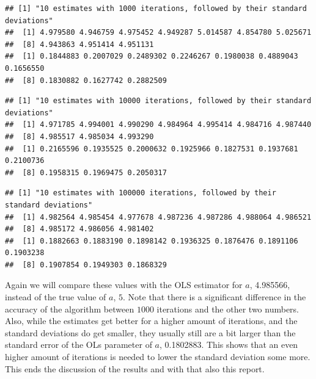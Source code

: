 \documentclass[a4paper,10pt]{article}\usepackage[]{graphicx}\usepackage[]{color}
\makeatletter
\newenvironment{kframe}{%
 \def\at@end@of@kframe{}%
 \ifinner\ifhmode%
  \def\at@end@of@kframe{\end{minipage}}%
  \begin{minipage}{\columnwidth}%
 \fi\fi%
 \def\FrameCommand##1{\hskip\@totalleftmargin \hskip-\fboxsep
 \colorbox{shadecolor}{##1}\hskip-\fboxsep
     \hskip-\linewidth \hskip-\@totalleftmargin \hskip\columnwidth}%
 \MakeFramed {\advance\hsize-\width
   \@totalleftmargin\z@ \linewidth\hsize
   \@setminipage}}%
 {\par\unskip\endMakeFramed%
 \at@end@of@kframe}
\newenvironment{knitrout}{}{} %
\makeatother
\begin{document}
\begin{knitrout}
\color{fgcolor}\begin{kframe}
\begin{verbatim}
## [1] "10 estimates with 1000 iterations, followed by their standard deviations"
##  [1] 4.979580 4.946759 4.975452 4.949287 5.014587 4.854780 5.025671
##  [8] 4.943863 4.951414 4.951131
##  [1] 0.1844883 0.2007029 0.2489302 0.2246267 0.1980038 0.4889043 0.1656550
##  [8] 0.1830882 0.1627742 0.2882509
\end{verbatim}
\end{kframe}
\end{knitrout}
\begin{knitrout}
\color{fgcolor}\begin{kframe}
\begin{verbatim}
## [1] "10 estimates with 10000 iterations, followed by their standard deviations"
##  [1] 4.971785 4.994001 4.990290 4.984964 4.995414 4.984716 4.987440
##  [8] 4.985517 4.985034 4.993290
##  [1] 0.2165596 0.1935525 0.2000632 0.1925966 0.1827531 0.1937681 0.2100736
##  [8] 0.1958315 0.1969475 0.2050317
\end{verbatim}
\end{kframe}
\end{knitrout}
\begin{knitrout}
\color{fgcolor}\begin{kframe}
\begin{verbatim}
## [1] "10 estimates with 100000 iterations, followed by their standard deviations"
##  [1] 4.982564 4.985454 4.977678 4.987236 4.987286 4.988064 4.986521
##  [8] 4.985172 4.986056 4.981402
##  [1] 0.1882663 0.1883190 0.1898142 0.1936325 0.1876476 0.1891106 0.1903238
##  [8] 0.1907854 0.1949303 0.1868329
\end{verbatim}
\end{kframe}
\end{knitrout}

\noindent Again we will compare these values with the OLS estimator for $a$, 4.985566, instead of the true value of $a$, $5$. Note that there is a significant difference in the accuracy of the algorithm between $1000$ iterations and the other two numbers. Also, while the estimates get better for a higher amount of iterations, and the standard deviations do get smaller, they usually still are a bit larger than the standard error of the OLs parameter of $a$, 0.1802883. This shows that an even higher amount of iterations is needed to lower the standard deviation some more. This ends the discussion of the results and with that also this report.
\end{document}
